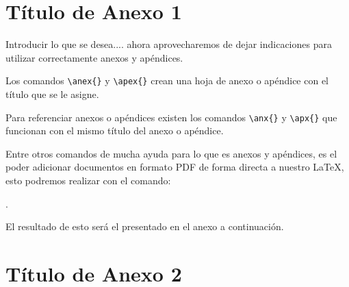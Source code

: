 
            \newpage
            
            \newcommand{\anex}[1]
            {
                \newpage
                \vspace*{\fill}
                \section[\normalfont#1]{#1}
                \label{anx:#1}
                \vspace*{\fill}
                \newpage
            }
            
            \appendix
            \renewcommand{\thesection}{\normalfont Anexo \arabic{section}}
            
            \setcounter{page}{1}
            \setcounter{figure}{0}
            \setcounter{table}{0}
            \titleformat{\section}{\bfseries\normalsize\flushright}{\MakeUppercase{\thesection}}{0em}{\\ \MakeUppercase}
            \captionsetup{list=no} %

%
%

\anex{Título de Anexo 1}
Introducir lo que se desea.... ahora aprovecharemos de dejar indicaciones para utilizar correctamente anexos y apéndices. 

Los comandos \verb|\anex{}| y \verb|\apex{}| crean una hoja de anexo o apéndice con el título que se le asigne. 

Para referenciar anexos o apéndices existen los comandos \verb|\anx{}| y \verb|\apx{}| que funcionan con el mismo título del anexo o apéndice.

Entre otros comandos de mucha ayuda para lo que es anexos y apéndices, es el poder adicionar documentos en formato PDF de forma directa a nuestro \LaTeX, esto podremos realizar con el comando:

\verb||. 

El resultado de esto será el presentado en el anexo a continuación.

\anex{Título de Anexo 2}
